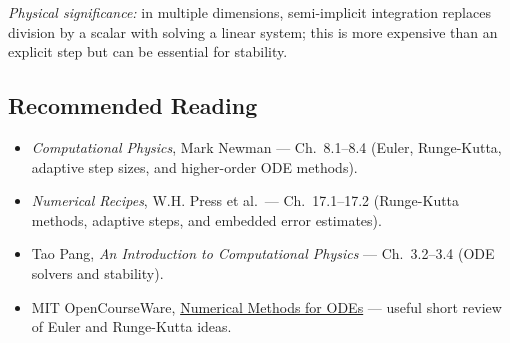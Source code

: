 \textit{Physical significance:} in multiple dimensions, semi-implicit
integration replaces division by a scalar with solving a linear system; this
is more expensive than an explicit step but can be essential for stability.

\subsection*{Recommended Reading}
\begin{itemize}
    \item \textit{Computational Physics}, Mark Newman --- Ch.\ 8.1--8.4
    (Euler, Runge-Kutta, adaptive step sizes, and higher-order ODE methods).
    \item \textit{Numerical Recipes}, W.H. Press et al.\ --- Ch.\ 17.1--17.2
    (Runge-Kutta methods, adaptive steps, and embedded error estimates).
    \item Tao Pang, \textit{An Introduction to Computational Physics} ---
    Ch.\ 3.2--3.4 (ODE solvers and stability).
    \item MIT OpenCourseWare, \href{https://ocw.mit.edu/courses/18-03sc-differential-equations-fall-2011/pages/unit-iii-fourier-series-and-laplace-transform/numerical-methods/}{Numerical Methods for ODEs}
    --- useful short review of Euler and Runge-Kutta ideas.
\end{itemize}
